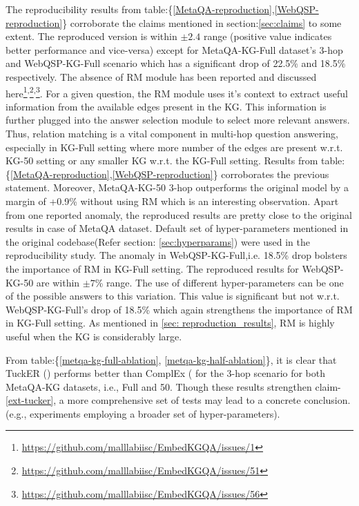 The reproducibility results from table:\{\ref{MetaQA-reproduction},\ref{WebQSP-reproduction}\} corroborate the claims mentioned in section:\ref{sec:claims} to some extent. The reproduced version is within $\pm 2.4$ range (positive value indicates better performance and vice-versa) except for MetaQA-KG-Full dataset's 3-hop and WebQSP-KG-Full scenario which has a significant drop of 22.5\% and 18.5\% respectively. The absence of RM module has been reported and discussed here\footnote{\url{https://github.com/malllabiisc/EmbedKGQA/issues/1}}\textsuperscript{,}\footnote{\url{https://github.com/malllabiisc/EmbedKGQA/issues/51}}\textsuperscript{,}\footnote{\url{https://github.com/malllabiisc/EmbedKGQA/issues/56}}. For a given question, the RM module uses it's context to extract useful information from the available edges present in the KG. This information is further plugged into the answer selection module to select more relevant answers. Thus, relation matching is a vital component in multi-hop question answering, especially in KG-Full setting where more number of the edges are present w.r.t. KG-50 setting or any smaller KG w.r.t. the KG-Full setting. Results from table:\{\ref{MetaQA-reproduction},\ref{WebQSP-reproduction}\} corroborates the previous statement. Moreover, MetaQA-KG-50 3-hop outperforms the original model by a margin of +0.9\% without using RM which is an interesting observation. Apart from one reported anomaly, the reproduced results are pretty close to the original results in case of MetaQA dataset. Default set of hyper-parameters mentioned in the original codebase(Refer section: \ref{sec:hyperparams}) were used in the reproducibility study. The anomaly in WebQSP-KG-Full,i.e. 18.5\% drop bolsters the importance of RM in KG-Full setting. The reproduced results for WebQSP-KG-50 are within $\pm7$\% range. The use of different hyper-parameters can be one of the possible answers to this variation. This value is significant but not w.r.t. WebQSP-KG-Full's drop of 18.5\% which again strengthens the importance of RM in KG-Full setting. As mentioned in \ref{sec: reproduction_results}, RM is highly useful when the KG is considerably large.

From table:\{\ref{metqa-kg-full-ablation}, \ref{metqa-kg-half-ablation}\}, it is clear that 
TuckER (\citep{tucker2019}) performs better than ComplEx (\citep{ComplEx2016} for the 3-hop scenario for both MetaQA-KG datasets, i.e., Full and 50. Though these results strengthen claim-\ref{ext-tucker}, a more comprehensive set of tests may lead to a concrete conclusion. (e.g., experiments employing a broader set of hyper-parameters). 

